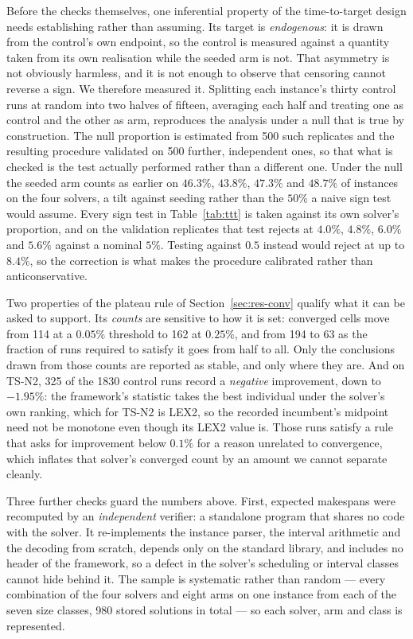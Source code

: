 \documentclass[review]{elsarticle}
\begin{document}
Before the checks themselves, one inferential property of the time-to-target
design needs establishing rather than assuming. Its target is
\emph{endogenous}: it is drawn from the control's own endpoint, so the
control is measured against a quantity taken from its own realisation while
the seeded arm is not. That asymmetry is not obviously harmless, and it is
not enough to observe that censoring cannot reverse a sign. We therefore
measured it. Splitting each instance's thirty control runs at random into
two halves of fifteen, averaging each half and treating one as control and
the other as arm, reproduces the analysis under a null that is true by
construction. The null proportion is estimated from 500 such replicates and
the resulting procedure validated on 500 further, independent ones, so that
what is checked is the test actually performed rather than a different one.
Under the null the seeded arm counts as earlier on $46.3\%$, $43.8\%$,
$47.3\%$ and $48.7\%$ of instances on the four solvers, a tilt against
seeding rather than the $50\%$ a naive sign test would assume. Every sign
test in Table~\ref{tab:ttt} is taken against its own solver's proportion,
and on the validation replicates that test rejects at $4.0\%$, $4.8\%$,
$6.0\%$ and $5.6\%$ against a nominal $5\%$. Testing against $0.5$ instead
would reject at up to $8.4\%$, so the correction is what makes the procedure
calibrated rather than anticonservative.

Two properties of the plateau rule of Section~\ref{sec:res-conv} qualify
what it can be asked to support. Its \emph{counts} are sensitive to how it
is set:
converged cells move from 114 at a $0.05\%$ threshold to 162 at $0.25\%$,
and from 194 to 63 as the fraction of runs required to satisfy it goes from
half to all. Only the conclusions drawn from those counts are reported as
stable, and only where they are. And on TS-N2, 325 of the 1830 control runs
record a \emph{negative} improvement, down to $-1.95\%$: the framework's
statistic takes the best individual under the solver's own ranking, which
for TS-N2 is LEX2, so the recorded incumbent's midpoint need not be
monotone even though its LEX2 value is. Those runs satisfy a rule that asks
for improvement below $0.1\%$ for a reason unrelated to convergence, which
inflates that solver's converged count by an amount we cannot separate
cleanly.

Three further checks guard the numbers above. First, expected makespans were
recomputed by an \emph{independent} verifier: a standalone program that
shares no code with the solver. It re-implements the instance parser, the
interval arithmetic and the decoding from scratch, depends only on the
standard library, and includes no header of the framework, so a defect in
the solver's scheduling or interval classes cannot hide behind it. The
sample is systematic rather than random --- every combination of the four
solvers and eight arms on one instance from each of the seven size classes,
980 stored solutions in total --- so each solver, arm and class is
represented.
\end{document}
